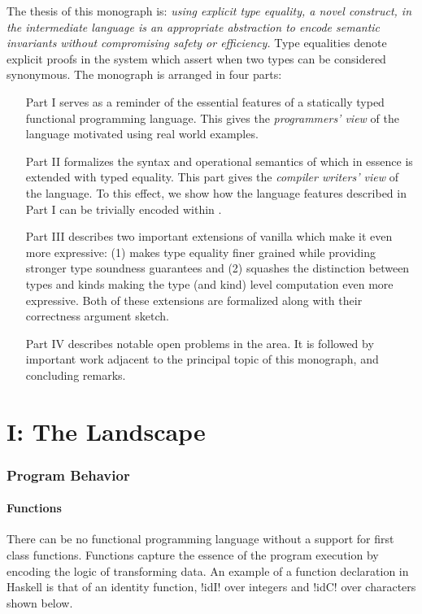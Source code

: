 \documentclass[screen,nonacm,manuscript,review]{acmart} %
\begin{document}
The thesis of this monograph is: \emph{using explicit type
  equality, a novel construct, in the intermediate language is an
  appropriate abstraction to encode semantic invariants without
  compromising safety or efficiency.}
Type equalities denote explicit proofs in the system which assert when
two types can be considered synonymous. The monograph
is arranged in four parts:
\begin{enumerate}
\item[Part I] serves as a reminder of the essential features
  of a statically typed functional programming language. This gives
  the \emph{programmers' view} of the language motivated using real
  world examples.
\item[Part II] formalizes the syntax and operational semantics of
  \SFC which in essence is \SF extended with typed equality. This part
  gives the \emph{compiler writers' view} of the language. To this
  effect, we show how the language features described in Part I can be
  trivially encoded within \SFC.
\item[Part III] describes two important extensions of vanilla \SFC
  which make it even more expressive:
  (1) \SFR makes type equality finer grained while
  providing stronger type soundness guarantees and
  (2) \SFK squashes the distinction between
  types and kinds making the type (and kind) level computation even
  more expressive. Both of these extensions are formalized along with
  their correctness argument sketch.
\item[Part IV] describes notable open problems in the area.
  It is followed by important work adjacent to the principal topic
  of this monograph, and concluding remarks.
\end{enumerate}

\part{I: The Landscape}\label{part:I}%
\section{Program Behavior}
\subsection{Functions}
There can be no functional programming language without a support for first class
functions. Functions capture the essence of the program execution by encoding the logic of
transforming data. An example of a function declaration in Haskell is that of an identity
function, !idI! over integers and !idC! over characters shown below.
\end{document}
